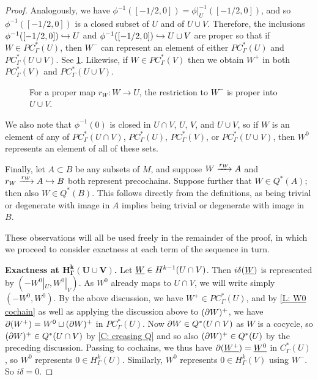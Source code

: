 \begin{proof}
	Analogously, we have $\phi^{-1}([-1/2,0]) = \phi|_U^{-1}([-1/2,0])$, and so $\phi^{-1}([-1/2,0])$ is a closed subset of $U$ and of $U \cup V$.
	Therefore, the inclusions $\phi^{-1}([-1/2,0]) \hookrightarrow U$ and $\phi^{-1}([-1/2,0]) \hookrightarrow U \cup V$ are proper so that if $W \in PC^*_\Gamma(U)$, then $W^-$ can represent an element of either $PC^*_\Gamma(U)$ and $PC^*_\Gamma(U \cup V)$.
	See \cref{F: MV2}.
	Likewise, if $W \in PC^*_\Gamma(V)$ then we obtain $W^+$ in both $PC^*_\Gamma(V)$ and $PC^*_\Gamma(U \cup V)$.

	\begin{figure}[h]
		
		\caption{For a proper map $r_W \colon W \to U$, the restriction to $W^-$ is proper into $U \cup V$.}
		\label{F: MV2}
	\end{figure}

	We also note that $\phi^{-1}(0)$ is closed in $U \cap V$, $U$, $V$, and $U \cup V$, so if $W$ is an element of any of $PC_\Gamma^*(U \cap V)$, $PC_\Gamma^*(U)$, $PC_\Gamma^*(V)$, or $PC_\Gamma^*(U \cup V)$, then $W^0$ represents an element of all of these sets.

	Finally, let $A \subset B$ be any subsets of $M$, and suppose $W \xrightarrow{r_W} A$ and $r_W \xrightarrow{r_W} A \hookrightarrow B$ both represent precochains.
	Suppose further that $W \in Q^*(A)$; then also $W \in Q^*(B)$.
	This follows directly from the definitions, as being trivial or degenerate with image in $A$ implies being trivial or degenerate with image in $B$.

	These observations will all be used freely in the remainder of the proof, in which we proceed to consider exactness at each term of the sequence in turn.

	\textbf{Exactness at $\mathbf{H^k_\Gamma(U \cup V)}$.}
	Let $\underline{W} \in H^{k-1}(U \cap V)$.
	Then $i\delta(\underline{W})$ is represented by $(-W^0|_U, W^0|_V)$.
	As $W^0$ already maps to $U \cap V$, we will write simply $(-W^0, W^0)$.
	By the above discussion, we have $W^+ \in PC^*_\Gamma(U)$, and by \cref{L: W0 cochain} as well as applying the discussion above to $(\partial W)^+$, we have $\partial (W^+) = W^0 \sqcup (\partial W)^+$ in $PC^*_\Gamma(U)$.
	Now $\partial W \in Q^*(U \cap V)$ as $W$ is a cocycle, so $(\partial W)^+ \in Q^*(U \cap V)$ by \cref{C: creasing Q} and so also $(\partial W)^+ \in Q^*(U)$ by the preceding discussion.
	Passing to cochains, we thus have $\partial (\underline{W^+}) = \underline{W^0}$ in $C^*_\Gamma(U)$, so $W^0$ represents $0 \in H^k_\Gamma(U)$.
	Similarly, $W^0$ represents $0 \in H^k_\Gamma(V)$ using $W^-$.
	So $i\delta = 0$.


\end{proof}
